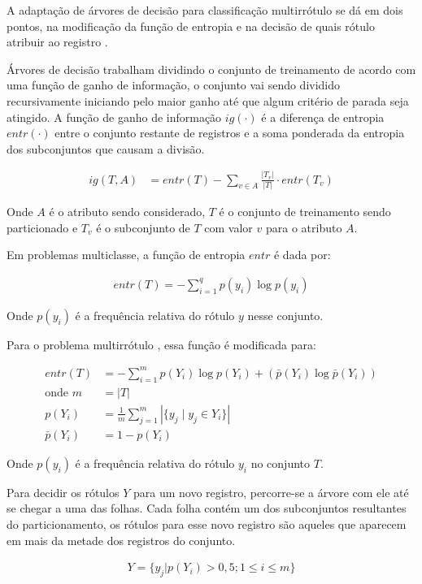 \documentclass[runningheads,a4paper]{llncs}
\begin{document}
A adaptação de árvores de decisão para classificação multirrótulo se dá em dois pontos, na modificação da função de entropia e na decisão de quais rótulo atribuir ao registro \cite{Clare2001-tq}.

Árvores de decisão trabalham dividindo o conjunto de treinamento de acordo com uma função de ganho de informação, o conjunto vai sendo dividido recursivamente iniciando pelo maior ganho até que algum critério de parada seja atingido. A função de ganho de informação $ig(\cdot)$ é a diferença de entropia $entr(\cdot)$ entre o conjunto restante de registros e a soma ponderada da entropia dos subconjuntos que causam a divisão.

\begin{align*}
	ig(T, A) &= entr(T) - \sum_{v \in A} \frac{|T_v|}{|T|} \cdot entr(T_v)
\end{align*}

Onde $A$ é o atributo sendo considerado, $T$ é o conjunto de treinamento sendo particionado e $T_v$ é o subconjunto de $T$ com valor $v$ para o atributo $A$.

Em problemas multiclasse, a função de entropia $entr$ é dada por:

\begin{align*}
	entr(T) = -\sum_{i = 1}^{q} p(y_i) \log p(y_i)
\end{align*}

Onde $p(y_i)$ é a frequência relativa do rótulo $y$ nesse conjunto.

Para o problema multirrótulo \cite{Clare2001-tq}, essa função é modificada para:

\begin{align*}
	entr(T) &= -\sum_{i = 1}^{m} p(Y_i) \log p(Y_i) + (\bar{p}(Y_i) \log \bar{p}(Y_i)) \\
	\text{onde } m &= |T| \\
	p(Y_i) &= \frac{1}{m}\sum_{j = 1}^{m} \left| \{y_j \mid y_j \in Y_i \} \right| \\
	\bar{p}(Y_i) &= 1 - p(Y_i)
\end{align*}

Onde $p(y_i)$ é a frequência relativa do rótulo $y_i$ no conjunto $T$.

Para decidir os rótulos $Y$ para um novo registro, percorre-se a árvore com ele até se chegar a uma das folhas. Cada folha contém um dos subconjuntos resultantes do particionamento, os rótulos para esse novo registro são aqueles que aparecem em mais da metade dos registros do conjunto.

\begin{align*}
	Y = \{ y_j | p(Y_i) > 0,5; 1 \leq i \leq m \}
\end{align*}
\end{document}

